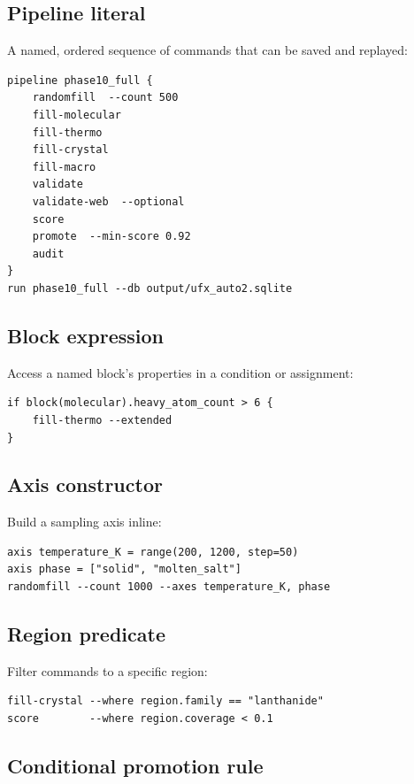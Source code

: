 \documentclass[11pt,letterpaper]{article}
\begin{document}
\subsection{Pipeline literal}

A named, ordered sequence of commands that can be saved and replayed:

\begin{lstlisting}
pipeline phase10_full {
	randomfill  --count 500
	fill-molecular
	fill-thermo
	fill-crystal
	fill-macro
	validate
	validate-web  --optional
	score
	promote  --min-score 0.92
	audit
}
run phase10_full --db output/ufx_auto2.sqlite
\end{lstlisting}

\subsection{Block expression}

Access a named block's properties in a condition or assignment:

\begin{lstlisting}
if block(molecular).heavy_atom_count > 6 {
	fill-thermo --extended
}
\end{lstlisting}

\subsection{Axis constructor}

Build a sampling axis inline:

\begin{lstlisting}
axis temperature_K = range(200, 1200, step=50)
axis phase = ["solid", "molten_salt"]
randomfill --count 1000 --axes temperature_K, phase
\end{lstlisting}

\subsection{Region predicate}

Filter commands to a specific region:

\begin{lstlisting}
fill-crystal --where region.family == "lanthanide"
score        --where region.coverage < 0.1
\end{lstlisting}

\subsection{Conditional promotion rule}
\end{document}
